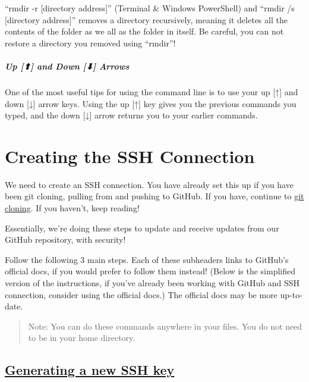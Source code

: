 \documentclass[
]{book}
\theoremstyle{definition}
\theoremstyle{definition}
\theoremstyle{definition}
\theoremstyle{definition}
\theoremstyle{remark}
\begin{document}
``rmdir -r {[}directory address{]}'' (Terminal \& Windows PowerShell) and ``rmdir /s {[}directory address{]}'' removes a directory recursively, meaning it deletes all the contents of the folder as we all as the folder in itself. Be careful, you can not restore a directory you removed using ``rmdir''!

\subparagraph*{Up {[}⬆{]} and Down {[}⬇{]} Arrows}\label{up-and-down-arrows}

One of the most useful tips for using the command line is to use your up {[}↑{]} and down {[}↓{]} arrow keys. Using the up {[}↑{]} key gives you the previous commands you typed, and the down {[}↓{]} arrow returns you to your earlier commands.

\section{Creating the SSH Connection}\label{creating-the-ssh-connection}

We need to create an SSH connection. You have already set this up if you have been git cloning, pulling from and pushing to GitHub. If you have, continue to \hyperref[git-clone]{git cloning}. If you haven't, keep reading!

Essentially, we're doing these steps to update and receive updates from our GitHub repository, with security!

Follow the following 3 main steps. Each of these subheaders links to GitHub's official docs, if you would prefer to follow them instead! (Below is the simplified version of the instructions, if you've already been working with GitHub and SSH connection, consider using the official docs.) The official docs may be more up-to-date.

\begin{quote}
Note: You can do these commands anywhere in your files. You do not need to be in your home directory.
\end{quote}

\subsection{\texorpdfstring{\href{https://docs.github.com/en/authentication/connecting-to-github-with-ssh/generating-a-new-ssh-key-and-adding-it-to-the-ssh-agent\#generating-a-new-ssh-key}{Generating a new SSH key}}{Generating a new SSH key}}\label{generating-a-new-ssh-key}
\end{document}
